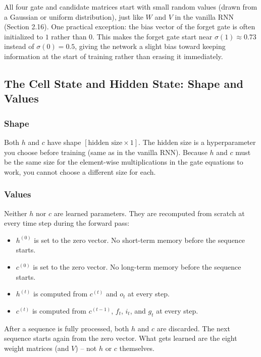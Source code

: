 All four gate and candidate matrices start with small random values (drawn from a
Gaussian or uniform distribution), just like $W$ and $V$ in the vanilla RNN
(Section 2.16). One practical exception: the bias vector of the forget gate is often
initialized to $1$ rather than $0$. This makes the forget gate start near $\sigma(1)
\approx 0.73$ instead of $\sigma(0) = 0.5$, giving the network a slight bias toward
keeping information at the start of training rather than erasing it immediately.

\subsection{The Cell State and Hidden State: Shape and Values}

\subsubsection{Shape}

Both $h$ and $c$ have shape $[\text{hidden size} \times 1]$. The hidden size is a
hyperparameter you choose before training (same as in the vanilla RNN). Because $h$
and $c$ must be the same size for the element-wise multiplications in the gate
equations to work, you cannot choose a different size for each.

\subsubsection{Values}

Neither $h$ nor $c$ are learned parameters. They are recomputed from scratch at every
time step during the forward pass:

\begin{itemize}
    \item $h^{(0)}$ is set to the zero vector. No short-term memory before the
    sequence starts.
    \item $c^{(0)}$ is set to the zero vector. No long-term memory before the
    sequence starts.
    \item $h^{(t)}$ is computed from $c^{(t)}$ and $o_t$ at every step.
    \item $c^{(t)}$ is computed from $c^{(t-1)}$, $f_t$, $i_t$, and $g_t$ at every
    step.
\end{itemize}

After a sequence is fully processed, both $h$ and $c$ are discarded. The next
sequence starts again from the zero vector. What gets learned are the eight weight
matrices (and $V$) -- not $h$ or $c$ themselves.

